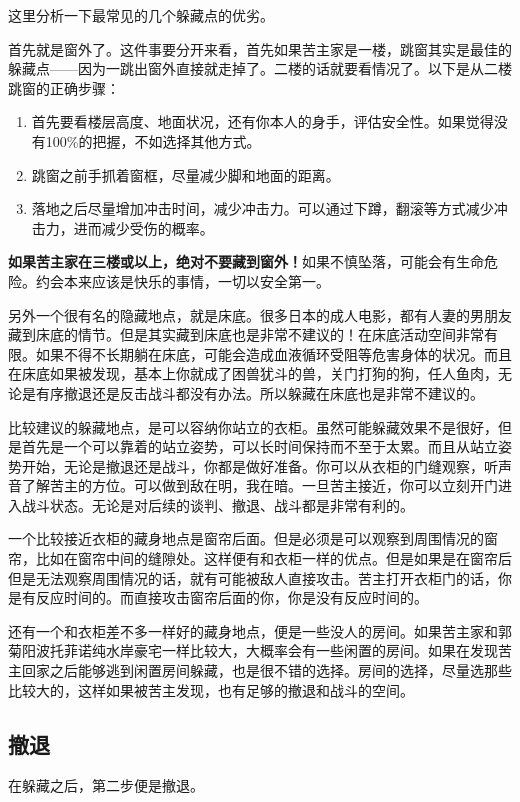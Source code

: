 这里分析一下最常见的几个躲藏点的优劣。

首先就是窗外了。这件事要分开来看，首先如果苦主家是一楼，跳窗其实是最佳的躲藏点——因为一跳出窗外直接就走掉了。二楼的话就要看情况了。以下是从二楼跳窗的正确步骤：
\begin{enumerate}
\item 首先要看楼层高度、地面状况，还有你本人的身手，评估安全性。如果觉得没有100\%的把握，不如选择其他方式。
\item 跳窗之前手抓着窗框，尽量减少脚和地面的距离。
\item 落地之后尽量增加冲击时间，减少冲击力。可以通过下蹲，翻滚等方式减少冲击力，进而减少受伤的概率。
\end{enumerate}

\textbf{如果苦主家在三楼或以上，绝对不要藏到窗外！}如果不慎坠落，可能会有生命危险。约会本来应该是快乐的事情，一切以安全第一。

另外一个很有名的隐藏地点，就是床底。很多日本的成人电影，都有人妻的男朋友藏到床底的情节。但是其实藏到床底也是非常不建议的！在床底活动空间非常有限。如果不得不长期躺在床底，可能会造成血液循环受阻等危害身体的状况。而且在床底如果被发现，基本上你就成了困兽犹斗的兽，关门打狗的狗，任人鱼肉，无论是有序撤退还是反击战斗都没有办法。所以躲藏在床底也是非常不建议的。

比较建议的躲藏地点，是可以容纳你站立的衣柜。虽然可能躲藏效果不是很好，但是首先是一个可以靠着的站立姿势，可以长时间保持而不至于太累。而且从站立姿势开始，无论是撤退还是战斗，你都是做好准备。你可以从衣柜的门缝观察，听声音了解苦主的方位。可以做到敌在明，我在暗。一旦苦主接近，你可以立刻开门进入战斗状态。无论是对后续的谈判、撤退、战斗都是非常有利的。

一个比较接近衣柜的藏身地点是窗帘后面。但是必须是可以观察到周围情况的窗帘，比如在窗帘中间的缝隙处。这样便有和衣柜一样的优点。但是如果是在窗帘后但是无法观察周围情况的话，就有可能被敌人直接攻击。苦主打开衣柜门的话，你是有反应时间的。而直接攻击窗帘后面的你，你是没有反应时间的。

还有一个和衣柜差不多一样好的藏身地点，便是一些没人的房间。如果苦主家和郭菊阳波托菲诺纯水岸豪宅一样比较大，大概率会有一些闲置的房间。如果在发现苦主回家之后能够逃到闲置房间躲藏，也是很不错的选择。房间的选择，尽量选那些比较大的，这样如果被苦主发现，也有足够的撤退和战斗的空间。

\subsection{撤退}

在躲藏之后，第二步便是撤退。


